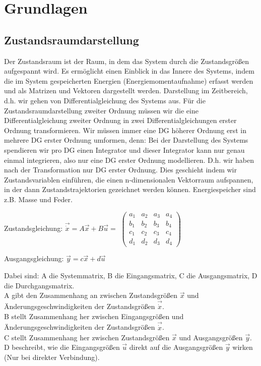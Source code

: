 \chapter{Grundlagen}
\label{sec:grundlagen}
\section{Zustandsraumdarstellung}
\label{subsec:zustandsraumdarstellung}
Der Zustandsraum ist der Raum, in dem das System durch die Zustandsgrößen aufgespannt wird. Es ermöglicht einen Einblick in das Innere des Systems, indem die im System gespeicherten Energien (Energiemomentaufnahme) erfasst werden und als Matrizen und Vektoren dargestellt werden.
Darstellung im Zeitbereich, d.h. wir gehen von Differentialgleichung des Systems aus. Für die Zustandsraumdarstellung zweiter Ordnung müssen wir die eine Differentialgleichung zweiter Ordnung in zwei Differentialgleichungen erster Ordnung transformieren.
Wir müssen immer eine DG höherer Ordnung erst in mehrere DG erster Ordnung umformen, denn: Bei der Darstellung des Systems spendieren wir pro DG einen Integrator und dieser Integrator kann nur genau einmal integrieren, also nur eine DG erster Ordnung modellieren.
D.h. wir haben nach der Transformation nur DG erster Ordnung.
Dies geschieht indem wir Zustandsvariablen einführen, die einen n-dimensionalen Vektorraum aufspannen, in der dann Zustandstrajektorien gezeichnet werden können. Energiespeicher sind z.B. Masse und Feder. 
\begin{flushleft}
Zustandsgleichung:
$  \vec{\dot{x}} = A\vec{x}+B\vec{u} = $
$
\begin{pmatrix}
a_1 & a_2 & a_3 & a_4 \\
b_1 & b_2 & b_3 & b_4 \\
c_1 & c_2 & c_3 & c_4 \\
d_1 & d_2 & d_3 & d_4
\end{pmatrix}
$ 
\end{flushleft}
\begin{flushleft}
Ausgangsgleichung:
$  \vec{y} = c\vec{x}+d\vec{u} $
\end{flushleft}
Dabei sind: A die Systemmatrix, B die Eingangsmatrix, C die Ausgangsmatrix, D die Durchgangsmatrix. \\
A gibt den Zusammenhang an zwischen Zustandsgrößen $\vec{x}$ und Änderungsgeschwindigkeiten der Zustandsgrößen $\vec{\dot{x}}$. \\
B stellt Zusammenhang her zwischen Eingangsgrößen und Änderungsgeschwindigkeiten der Zustandsgrößen $\vec{\dot{x}}$. \\
C stellt Zusammenhang her zwischen Zustandsgrößen $\vec{x}$ und Ausgangsgrößen $\vec{y}$. \\
D beschreibt, wie die Eingangsgrößen $\vec{u}$ direkt auf die Ausgangsgrößen $\vec{y}$ wirken (Nur bei direkter Verbindung). \\

